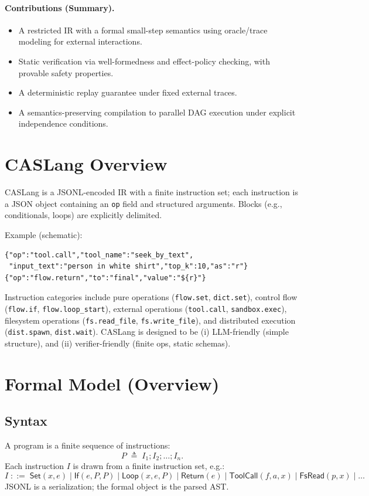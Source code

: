 \documentclass[sigplan,nonacm,10pt]{acmart}
\begin{document}
\paragraph{Contributions (Summary).}
\begin{itemize}\itemsep2pt
\item A restricted IR with a formal small-step semantics using oracle/trace modeling for external interactions.
\item Static verification via well-formedness and effect-policy checking, with provable safety properties.
\item A deterministic replay guarantee under fixed external traces.
\item A semantics-preserving compilation to parallel DAG execution under explicit independence conditions.
\end{itemize}

\section{CASLang Overview}
CASLang is a JSONL-encoded IR with a finite instruction set; each instruction is a JSON object containing an \texttt{op} field and structured arguments. Blocks (e.g., conditionals, loops) are explicitly delimited.

Example (schematic):
\begin{verbatim}
{"op":"tool.call","tool_name":"seek_by_text",
 "input_text":"person in white shirt","top_k":10,"as":"r"}
{"op":"flow.return","to":"final","value":"${r}"}
\end{verbatim}

Instruction categories include pure operations (\texttt{flow.set}, \texttt{dict.set}), control flow (\texttt{flow.if}, \texttt{flow.loop\_start}), external operations (\texttt{tool.call}, \texttt{sandbox.exec}), filesystem operations (\texttt{fs.read\_file}, \texttt{fs.write\_file}), and distributed execution (\texttt{dist.spawn}, \texttt{dist.wait}). CASLang is designed to be (i) LLM-friendly (simple structure), and (ii) verifier-friendly (finite ops, static schemas).

\section{Formal Model (Overview)}
\subsection{Syntax}
A program is a finite sequence of instructions:
\[
P \;\triangleq\; I_1; I_2; \dots; I_n.
\]
Each instruction $I$ is drawn from a finite instruction set, e.g.:
\[
I \;::=\; \textsf{Set}(x,e)
\mid \textsf{If}(e,P,P)
\mid \textsf{Loop}(x,e,P)
\mid \textsf{Return}(e)
\mid \textsf{ToolCall}(f,a,x)
\mid \textsf{FsRead}(p,x)
\mid \dots
\]
JSONL is a serialization; the formal object is the parsed AST.
\end{document}
